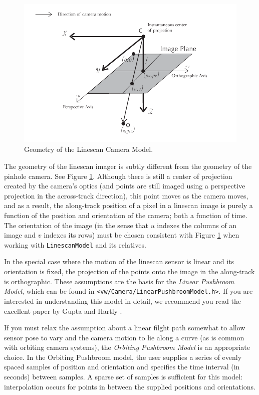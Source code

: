\begin{figure}[tbp]
\begin{center}
  \includegraphics[width=6in]{images/linescan_geometry.pdf}
 \end{center}
  \caption{Geometry of the Linescan Camera Model.}
  \label{fig:linescan-geometry}
\end{figure}

The geometry of the linescan imager is subtly different from the
geometry of the pinhole camera.  See Figure
\ref{fig:linescan-geometry}.  Although there is still a center of
projection created by the camera's optics (and points are still imaged
using a perspective projection in the across-track direction), this
point moves as the camera moves, and as a result, the along-track
position of a pixel in a linescan image is purely a function of the
position and orientation of the camera; both a function of time.  The
orientation of the image (in the sense that $u$ indexes the columns of
an image and $v$ indexes its rows) must be chosen consistent with
Figure \ref{fig:linescan-geometry} when working with
\verb#LinescanModel# and its relatives.

In the special case where the motion of the linescan sensor is linear
and its orientation is fixed, the projection of the points onto the
image in the along-track is orthographic.  These assumptions are the
basis for the {\em Linear Pushbroom Model}, which can be found in
\verb#<vw/Camera/LinearPushbroomModel.h>#.  If you are interested in
understanding this model in detail, we recommend you read the
excellent paper by Gupta and Hartly \cite{gupta97}.

If you must relax the assumption about a linear filght path somewhat
to allow sensor pose to vary and the camera motion to lie along a
curve (as is common with orbiting camera systems), the {\em Orbiting
  Pushbroom Model} is an appropriate choice.  In the Orbiting
Pushbroom model, the user supplies a series of evenly spaced samples
of position and orientation and specifies the time interval (in
seconds) between samples.  A sparse set of samples is sufficient for
this model: interpolation occurs for points in between the supplied
positions and orientations.

